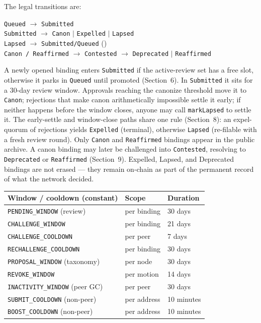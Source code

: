 \documentclass[11pt,a4paper]{article}
\newcommand{\arr}{\ensuremath{\rightarrow}}
\begin{document}
\vspace{0.6em}

The legal transitions are:

\begin{plainbox}
\centering
\texttt{Queued} \;\arr\; \texttt{Submitted}\\[0.4em]
\texttt{Submitted} \;\arr\; \texttt{Canon} \;$\mid$\; \texttt{Expelled} \;$\mid$\; \texttt{Lapsed}\\[0.4em]
\texttt{Lapsed} \;\arr\; \texttt{Submitted/Queued} \;\;()\\[0.4em]
\texttt{Canon\,/\,Reaffirmed} \;\arr\; \texttt{Contested} \;\arr\; \texttt{Deprecated} \;$\mid$\; \texttt{Reaffirmed}
\end{plainbox}

A newly opened binding enters \texttt{Submitted} if the active-review set has
a free slot, otherwise it parks in \texttt{Queued} until promoted
(Section~6). In \texttt{Submitted} it sits for a 30-day review window.
Approvals reaching the canonize threshold move it to \texttt{Canon};
rejections that make canon arithmetically impossible settle it early; if
neither happens before the window closes, anyone may call \texttt{markLapsed}
to settle it. The early-settle and window-close paths share one rule
(Section~8): an expel-quorum of rejections yields \texttt{Expelled}
(terminal), otherwise \texttt{Lapsed} (re-filable with a fresh review round).
Only \texttt{Canon} and \texttt{Reaffirmed} bindings appear in the public
archive. A canon binding may later be challenged into \texttt{Contested},
resolving to \texttt{Deprecated} or \texttt{Reaffirmed} (Section~9).
Expelled, Lapsed, and Deprecated bindings are not erased --- they remain
on-chain as part of the permanent record of what the network decided.

\begin{center}
\begin{tabular}{@{}lll@{}}
\toprule
\textbf{Window / cooldown (constant)} & \textbf{Scope} & \textbf{Duration} \\
\midrule
\texttt{PENDING\_WINDOW} (review)        & per binding & 30 days \\
\texttt{CHALLENGE\_WINDOW}               & per binding & 21 days \\
\texttt{CHALLENGE\_COOLDOWN}             & per peer    & 7 days  \\
\texttt{RECHALLENGE\_COOLDOWN}           & per binding & 30 days \\
\texttt{PROPOSAL\_WINDOW} (taxonomy)     & per node    & 30 days \\
\texttt{REVOKE\_WINDOW}                  & per motion  & 14 days \\
\texttt{INACTIVITY\_WINDOW} (peer GC)    & per peer    & 30 days \\
\texttt{SUBMIT\_COOLDOWN} (non-peer)     & per address & 10 minutes \\
\texttt{BOOST\_COOLDOWN} (non-peer)      & per address & 10 minutes \\
\bottomrule
\end{tabular}
\end{center}
\end{document}
